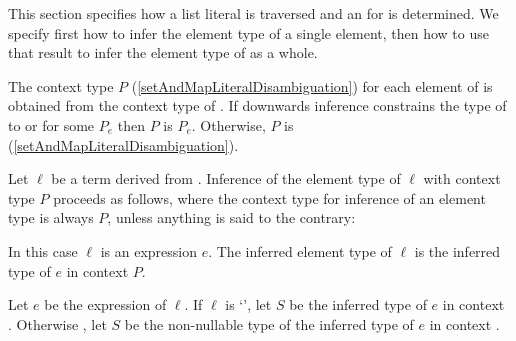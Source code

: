 \documentclass[makeidx]{article}
\begin{document}
{\LMHash{}%
This section specifies how a list literal  is traversed and an
for  is determined.
We specify first how to infer the element type of a single element,
then how to use that result to infer
the element type of  as a whole.

\LMHash{}%
The context type $P$
(\ref{setAndMapLiteralDisambiguation})
for each element of  is
obtained from the context type of .
If downwards inference constrains the type of 
to  or  for some $P_e$
then $P$ is $P_e$.
Otherwise, $P$ is \FreeContext{}
(\ref{setAndMapLiteralDisambiguation}).

\LMHash{}%
Let $\ell$ be a term derived from .
Inference of the element type of $\ell$ with context type $P$
proceeds as follows,
where the context type for inference of an element type is always $P$,
unless anything is said to the contrary:

\LMHash{}%
In this case $\ell$ is an expression $e$.
The inferred element type of $\ell$ is
the inferred type of $e$ in context $P$.
\EndCase

\LMHash{}%
\EndCase

\LMHash{}%
Let $e$ be the expression of $\ell$.
If $\ell$ is `',
let $S$ be the inferred type of $e$ in context .
Otherwise
,
let $S$ be the non-nullable type of
the inferred type of $e$ in context .

}
\end{document}

